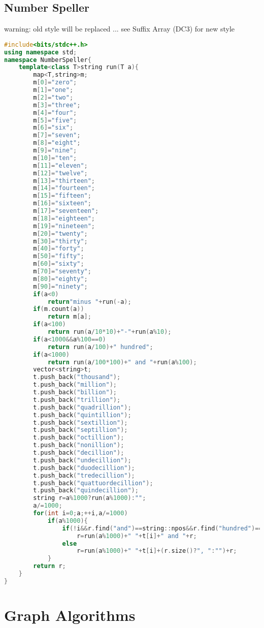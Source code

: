 \documentclass{book}
\begin{document}
\section{Number Speller}
warning: old style will be replaced ... see Suffix Array (DC3) for new style\begin{lstlisting}[language=C++,title={Number Speller.hpp (2143 bytes, 72 lines)}]
#include<bits/stdc++.h>
using namespace std;
namespace NumberSpeller{
    template<class T>string run(T a){
        map<T,string>m;
        m[0]="zero";
        m[1]="one";
        m[2]="two";
        m[3]="three";
        m[4]="four";
        m[5]="five";
        m[6]="six";
        m[7]="seven";
        m[8]="eight";
        m[9]="nine";
        m[10]="ten";
        m[11]="eleven";
        m[12]="twelve";
        m[13]="thirteen";
        m[14]="fourteen";
        m[15]="fifteen";
        m[16]="sixteen";
        m[17]="seventeen";
        m[18]="eighteen";
        m[19]="nineteen";
        m[20]="twenty";
        m[30]="thirty";
        m[40]="forty";
        m[50]="fifty";
        m[60]="sixty";
        m[70]="seventy";
        m[80]="eighty";
        m[90]="ninety";
        if(a<0)
            return"minus "+run(-a);
        if(m.count(a))
            return m[a];
        if(a<100)
            return run(a/10*10)+"-"+run(a%10);
        if(a<1000&&a%100==0)
            return run(a/100)+" hundred";
        if(a<1000)
            return run(a/100*100)+" and "+run(a%100);
        vector<string>t;
        t.push_back("thousand");
        t.push_back("million");
        t.push_back("billion");
        t.push_back("trillion");
        t.push_back("quadrillion");
        t.push_back("quintillion");
        t.push_back("sextillion");
        t.push_back("septillion");
        t.push_back("octillion");
        t.push_back("nonillion");
        t.push_back("decillion");
        t.push_back("undecillion");
        t.push_back("duodecillion");
        t.push_back("tredecillion");
        t.push_back("quattuordecillion");
        t.push_back("quindecillion");
        string r=a%1000?run(a%1000):"";
        a/=1000;
        for(int i=0;a;++i,a/=1000)
            if(a%1000){
                if(!i&&r.find("and")==string::npos&&r.find("hundred")==string::npos&&r.size())
                    r=run(a%1000)+" "+t[i]+" and "+r;
                else
                    r=run(a%1000)+" "+t[i]+(r.size()?", ":"")+r;
            }
        return r;
    }
}
\end{lstlisting}
\chapter{Graph Algorithms}
\newpage
{}
\end{document}
